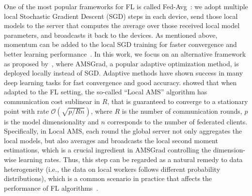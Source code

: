 \documentclass[11pt]{article}
\begin{document}

One of the most popular frameworks for FL is called Fed-Avg~\citep{mcmahan2017communication}: we adopt multiple local Stochastic Gradient Descent (SGD) steps in each device, send those local models to the server that computes the average over those received local model parameters, and broadcasts it back to the devices. As mentioned above, momentum can be added to the local SGD training for faster convergence and better learning performance~\citep{yu2019linear}. In this work, we focus on an alternative framework as proposed by~\citet{chen2020toward}, where AMSGrad, a popular adaptive optimization method, is deployed locally instead of SGD. Adaptive methods have shown success in many deep learning tasks for fast convergence and good accuracy. \citet{chen2020toward} showed that when adapted to the FL setting, the so-called ``Local AMS'' algorithm has communication cost sublinear in $R$, that is guaranteed to converge to a stationary point with rate $\mathcal{O}(\sqrt{p/Rn})$, where $R$ is the number of communication rounds, $p$ is the model dimensionality and $n$ corresponds to the number of federated clients. Specifically, in Local AMS, each round the global server not only aggregates the local models, but also averages and broadcasts the local second moment estimations, which is a crucial ingredient in AMSGrad controlling the dimension-wise learning rates. Thus, this step can be regarded as a natural remedy to data heterogeneity (i.e., the data on local workers follows different probability distributions), which is a common scenario in practice that affects the performance of FL algorithms~\citep{li2019federated,liang2019variance,karimireddy2019scaffold}.


\vspace{0.1in}
\end{document}
